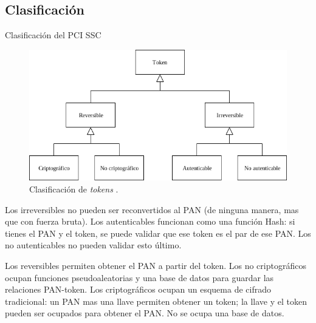 %
%
%

\subsection{Clasificación}

\begin{frame}{Clasificación del PCI SSC}

  \begin{figure}[H]
    \begin{center}
      \includegraphics[width=1.0\linewidth]
        {../../../diagramas_comunes/clasificacion/clasificacion.png}
      \caption{Clasificación de \textit{tokens} \cite{pci_tokens}.}
    \end{center}
  \end{figure}

  \note
  {
    Los irreversibles no pueden ser reconvertidos al PAN (de ninguna manera,
    mas que con fuerza bruta). Los autenticables funcionan como una función
    Hash: si tienes el PAN y el token, se puede validar que ese token es el
    par de ese PAN. Los no autenticables no pueden validar esto último.

    Los reversibles permiten obtener el PAN a partir del token. Los no
    criptográficos ocupan funciones pseudoaleatorias y una base de datos
    para guardar las relaciones PAN-token. Los criptográficos ocupan un
    esquema de cifrado tradicional: un PAN mas una llave permiten obtener
    un token; la llave y el token pueden ser ocupados para obtener el PAN. No
    se ocupa una base de datos.
  }

\end{frame}

